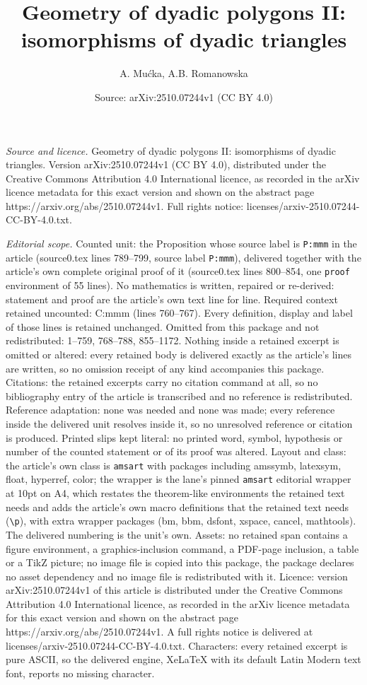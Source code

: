 \documentclass[10pt,a4paper]{amsart}
\title[Geometry of dyadic polygons II: isomorphisms of dyadic trian]{Geometry of dyadic polygons II: isomorphisms of dyadic triangles}
\author{A. Mu\'cka, A.B. Romanowska}
\date{Source: arXiv:2510.07244v1 (CC BY 4.0)}
\begin{document}
\maketitle

\noindent\emph{Source and licence.} Geometry of dyadic polygons II: isomorphisms of dyadic triangles. Version arXiv:2510.07244v1 (CC BY 4.0), distributed under the Creative Commons Attribution 4.0 International licence, as recorded in the arXiv licence metadata for this exact version and shown on the abstract page https://arxiv.org/abs/2510.07244v1. Full rights notice: licenses/arxiv-2510.07244-CC-BY-4.0.txt.\par\smallskip

\noindent\textit{Editorial scope.} Counted unit: the Proposition whose source label is \texttt{P:mmm} in the article (source0.tex lines 789--799, source label \texttt{P:mmm}), delivered together with the article's own complete original proof of it (source0.tex lines 800--854, one \texttt{proof} environment of 55 lines). No mathematics is written, repaired or re-derived: statement and proof are the article's own text line for line. Required context retained uncounted: C:mmm (lines 760--767). Every definition, display and label of those lines is retained unchanged. Omitted from this package and not redistributed: 1--759, 768--788, 855--1172. Nothing inside a retained excerpt is omitted or altered: every retained body is delivered exactly as the article's lines are written, so no omission receipt of any kind accompanies this package. Citations: the retained excerpts carry no citation command at all, so no bibliography entry of the article is transcribed and no reference is redistributed. Reference adaptation: none was needed and none was made; every reference inside the delivered unit resolves inside it, so no unresolved reference or citation is produced. Printed slips kept literal: no printed word, symbol, hypothesis or number of the counted statement or of its proof was altered. Layout and class: the article's own class is \texttt{amsart} with packages including amssymb, latexsym, float, hyperref, color; the wrapper is the lane's pinned \texttt{amsart} editorial wrapper at 10pt on A4, which restates the theorem-like environments the retained text needs and adds the article's own macro definitions that the retained text needs (\texttt{\textbackslash p}), with extra wrapper packages (bm, bbm, dsfont, xspace, cancel, mathtools). The delivered numbering is the unit's own. Assets: no retained span contains a figure environment, a graphics-inclusion command, a PDF-page inclusion, a table or a TikZ picture; no image file is copied into this package, the package declares no asset dependency and no image file is redistributed with it. Licence: version arXiv:2510.07244v1 of this article is distributed under the Creative Commons Attribution 4.0 International licence, as recorded in the arXiv licence metadata for this exact version and shown on the abstract page https://arxiv.org/abs/2510.07244v1. A full rights notice is delivered at licenses/arxiv-2510.07244-CC-BY-4.0.txt. Characters: every retained excerpt is pure ASCII, so the delivered engine, XeLaTeX with its default Latin Modern text font, reports no missing character.
\end{document}
